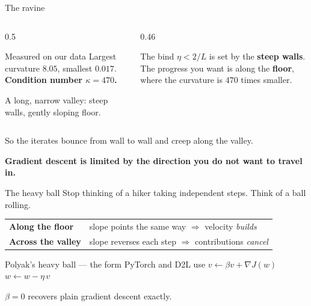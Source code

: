 \documentclass[aspectratio=169]{beamer}
\begin{document}
\begin{frame}{The ravine}
  \begin{columns}[T]
    \begin{column}{0.5\textwidth}
      \begin{block}{Measured on our data}
        Largest curvature $8.05$, smallest $0.017$.\\[0.3em]
        \textbf{Condition number $\kappa = 470$.}
      \end{block}
      \vspace{0.2em}
      A long, narrow valley: steep walls, gently sloping floor.
    \end{column}
    \begin{column}{0.46\textwidth}
      \begin{alertblock}{The bind}
        $\eta < 2/L$ is set by the \textbf{steep walls}.\\[0.3em]
        The progress you want is along the \textbf{floor}, where the curvature
        is $470$ times smaller.
      \end{alertblock}
    \end{column}
  \end{columns}
  \vspace{0.6em}
  \begin{center}
    So the iterates bounce from wall to wall and creep along the valley.
  \end{center}
  \vspace{0.2em}
  \begin{center}\small
    \textbf{Gradient descent is limited by the direction you do not want to
    travel in.}
  \end{center}
\end{frame}

\begin{frame}{The heavy ball}
  Stop thinking of a hiker taking independent steps. Think of a ball rolling.
  \vspace{0.4em}
  \begin{center}
  \begin{tabular}{@{}ll@{}}
    \toprule
    \textbf{Along the floor} & slope points the same way $\Rightarrow$ velocity
      \emph{builds}\\
    \textbf{Across the valley} & slope reverses each step $\Rightarrow$
      contributions \emph{cancel}\\
    \bottomrule
  \end{tabular}
  \end{center}
  \vspace{0.6em}
  \begin{exampleblock}{Polyak's heavy ball --- the form PyTorch and D2L use}
    \centering\Large
    $v \leftarrow \beta v + \nabla J(w)$ \qquad
    $w \leftarrow w - \eta\, v$
  \end{exampleblock}
  \vspace{0.3em}
  \begin{center}\small
    $\beta = 0$ recovers plain gradient descent exactly.
  \end{center}
\end{frame}
\end{document}
